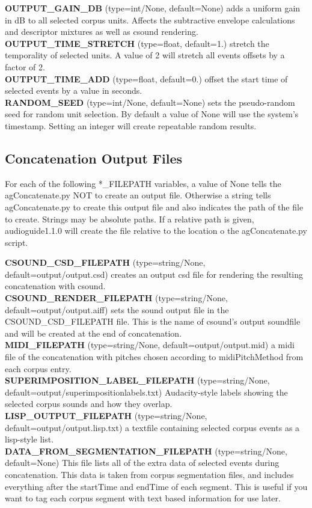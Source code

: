 \documentclass{article}
\newcommand{\optEntry}[4]{\textbf{#1} (type=#2, default=#3) #4\hspace{0.5em}\\}
\newcommand{\ag}{audioguide1.1.0\xspace}
\begin{document}
\begin{spacing}{1.2}
\optEntry{OUTPUT\_GAIN\_DB}{int/None}{None}{adds a uniform gain in dB to all selected corpus units.  Affects the subtractive envelope calculations and descriptor mixtures as well as csound rendering.}

\optEntry{OUTPUT\_TIME\_STRETCH}{float}{1.}{stretch the temporality of selected units.  A value of 2 will stretch all events offsets by a factor of 2.}

\optEntry{OUTPUT\_TIME\_ADD}{float}{0.}{offset the start time of selected events by a value in seconds.}

\optEntry{RANDOM\_SEED}{int/None}{None}{sets the pseudo-random seed for random unit selection.  By default a value of None will use the system's timestamp.  Setting an integer will create repeatable random results.}


\subsection{Concatenation Output Files}\label{outputfiles}
For each of the following *\_FILEPATH variables, a value of None tells the agConcatenate.py NOT to create an output file.  Otherwise a string tells agConcatenate.py to create this output file and also indicates the path of the file to create.  Strings may be absolute paths.  If a relative path is given, \ag will create the file relative to the location o the agConcatenate.py script.

\optEntry{CSOUND\_CSD\_FILEPATH}{string/None}{output/output.csd}{creates an output csd file for rendering the resulting concatenation with csound.}

\optEntry{CSOUND\_RENDER\_FILEPATH}{string/None}{output/output.aiff}{sets the sound output file in the CSOUND\_CSD\_FILEPATH file.  This is the name of csound's output soundfile and will be created at the end of concatenation.}

\optEntry{MIDI\_FILEPATH}{string/None}{output/output.mid}{a midi file of the concatenation with pitches chosen according to midiPitchMethod from each corpus entry.}

\optEntry{SUPERIMPOSITION\_LABEL\_FILEPATH}{string/None}{output/superimpositionlabels.txt}{Audacity-style labels showing the selected corpus sounds and how they overlap.}

\optEntry{LISP\_OUTPUT\_FILEPATH}{string/None}{output/output.lisp.txt}{a textfile containing selected corpus events as a lisp-style list.}

\optEntry{DATA\_FROM\_SEGMENTATION\_FILEPATH}{string/None}{None}{This file lists all of the extra data of selected events during concatenation.  This data is taken from corpus segmentation files, and includes everything after the startTime and endTime of each segment.  This is useful if you want to tag each corpus segment with text based information for use later.}


\end{spacing}
\end{document}
